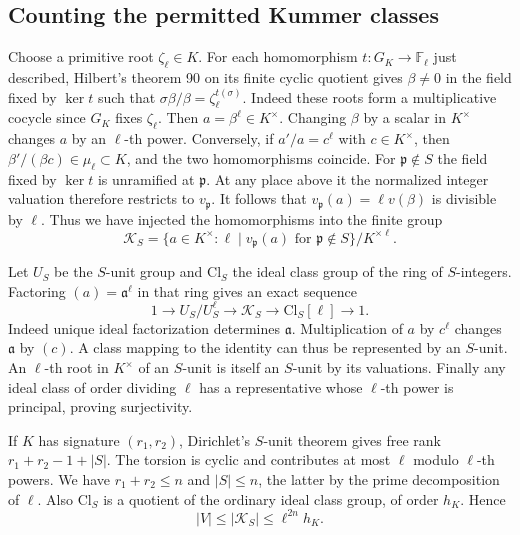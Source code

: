 \subsection{Counting the permitted Kummer classes}

Choose a primitive root \(\zeta_\ell\in K\). For each homomorphism
\(t:G_K\to\mathbb F_\ell\) just described, Hilbert's theorem 90
on its finite cyclic quotient gives \(\beta\ne0\) in the field
fixed by \(\ker t\) such that
\(\sigma\beta/\beta=\zeta_\ell^{t(\sigma)}\).
Indeed these roots form a multiplicative cocycle since
\(G_K\) fixes \(\zeta_\ell\). Then \(a=\beta^\ell\in K^\times\).
Changing \(\beta\) by a scalar in \(K^\times\) changes \(a\) by
an \(\ell\)-th power. Conversely, if \(a'/a=c^\ell\) with
\(c\in K^\times\), then \(\beta'/(\beta c)\in\mu_\ell\subset K\),
and the two homomorphisms coincide. For \(\mathfrak p\notin S\)
the field fixed by \(\ker t\) is unramified at \(\mathfrak p\).
At any place above it the normalized integer valuation therefore
restricts to \(v_{\mathfrak p}\). It follows that
\(v_{\mathfrak p}(a)=\ell v(\beta)\) is divisible by \(\ell\).
Thus we have injected the homomorphisms into the finite group
\[
 \mathcal K_S=\{a\in K^\times:
          \ell\mid v_{\mathfrak p}(a)\text{ for }\mathfrak p\notin S\}
                      /K^{\times\ell}.
\]

Let \(U_S\) be the \(S\)-unit group and \(\mathrm{Cl}_S\) the
ideal class group of the ring of \(S\)-integers. Factoring
\((a)=\mathfrak a^\ell\) in that ring gives an exact sequence
\[
 1\longrightarrow U_S/U_S^\ell\longrightarrow \mathcal K_S
       \longrightarrow\mathrm{Cl}_S[\ell]\longrightarrow 1 .
\]
Indeed unique ideal factorization determines \(\mathfrak a\).
Multiplication of \(a\) by \(c^\ell\) changes \(\mathfrak a\) by
\((c)\). A class mapping to the identity can thus be represented by
an \(S\)-unit. An \(\ell\)-th root in \(K^\times\) of an \(S\)-unit
is itself an \(S\)-unit by its valuations. Finally any ideal class
of order dividing \(\ell\) has a representative whose \(\ell\)-th
power is principal, proving surjectivity.

If \(K\) has signature \((r_1,r_2)\), Dirichlet's \(S\)-unit theorem
gives free rank \(r_1+r_2-1+|S|\). The torsion is cyclic and contributes
at most \(\ell\) modulo \(\ell\)-th powers. We have \(r_1+r_2\le n\)
and \(|S|\le n\), the latter by the prime decomposition of \(\ell\).
Also \(\mathrm{Cl}_S\) is a quotient of the ordinary ideal class
group, of order \(h_K\). Hence
\[
      |V|\le|\mathcal K_S|\le\ell^{2n} h_K .
\]

